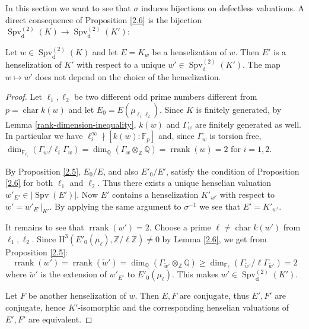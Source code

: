 In this section we want to see that $\sigma$ induces bijections on defectless valuations. A direct consequence of Proposition \ref{2.6} is the bijection $\operatorname{Spv}_\text{d}^{(2)}(K)\to \operatorname{Spv}_\text{d}^{(2)}(K')$:

\begin{lemma}\label{3.1}
Let $w\in\operatorname{Spv}_\text{d}^{(2)}(K)$ and let $E=K_w$ be a henselization of $w$. Then $E'$ is a henselization of $K'$ with respect to a unique $w'\in\operatorname{Spv}_\text{d}^{(2)}(K')$. The map $w\mapsto w'$ does not depend on the choice of the henselization.
\end{lemma}

\begin{proof}
Let $\ell_1,\ell_2$ be two different odd prime numbers different from $p=\operatorname{char} k(w)$ and let $E_0 = E(\mu_{\ell_1\ell_2})$. Since $K$ is finitely generated, by Lemma \ref{rank-dimension-inequality}, $k(w)$ and $\Gamma_w$ are finitely generated as well. In particular we have $\ell_i^\infty \nmid [k(w):\mathbb{F}_p]$ and, since $\Gamma_w$ is torsion free, $\dim_{\mathbb{F}_{\ell_i}}(\Gamma_w/{\ell_i}\Gamma_w) = \dim_{\mathbb{Q}}(\Gamma_w\otimes_{\mathbb{Z}}\mathbb{Q})= \operatorname{rrank}(w)=2$ for $i=1,2$.

By Proposition \ref{2.5}, $E_0/E$, and also $E'_0/E'$, satisfy the condition of Proposition \ref{2.6} for both $\ell_1$ and $\ell_2$. Thus there exists a unique henselian valuation $w'_{E'}\in|\operatorname{Spv}(E')|$. Now $E'$ contains a henselization $K'_{w'}$ with respect to $w' = w'_{E'}|_{K'}$. By applying the same argument to $\sigma^{-1}$ we see that $E' = K'_{w'}$.

It remains to see that $\operatorname{rrank}(w')=2$. Choose a prime $\ell\neq \operatorname{char} k(w')$ from $\ell_1,\ell_2$. Since $\mathrm{H}^3(E'_0(\mu_{\ell}),\mathbb{Z}/\ell\mathbb{Z})\neq 0$ by Lemma \ref{2.6}, we get from Proposition \ref{2.5}:
\[\operatorname{rrank}(w')= \operatorname{rrank}( \widetilde{w}') = \dim_{\mathbb{Q}}(\Gamma_{\widetilde{w}'}\otimes_\mathbb{Z}\mathbb{Q}) \geq \dim_{\mathbb{F}_\ell}(\Gamma_{\widetilde{w}'}/\ell\Gamma_{\widetilde{w}'})=2\]
where $\widetilde{w}'$ is the extension of $w'_{E'}$ to $E'_0(\mu_{\ell})$. This makes $w'\in\operatorname{Spv}^{(2)}_\text{d}(K')$. 

Let $F$ be another henselization of $w$. Then $E, F$ are conjugate, thus $E',F'$ are conjugate, hence $K'$-isomorphic and the corresponding henselian valuations of $E', F'$ are equivalent.
\end{proof}


